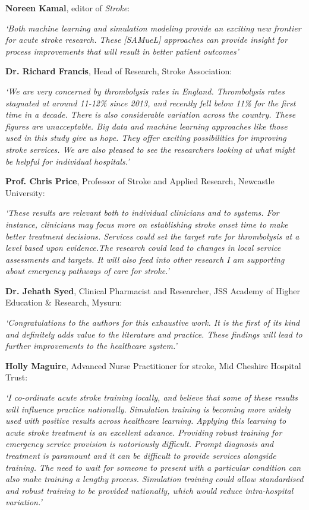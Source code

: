 \textbf{Noreen Kamal}, editor of \textit{Stroke}:

\textit{`Both machine learning and simulation modeling provide an exciting new frontier for acute stroke research. These [SAMueL] approaches can provide insight for process improvements that will result in better patient outcomes’}

\textbf{Dr. Richard Francis}, Head of Research, Stroke Association:

\textit{`We are very concerned by thrombolysis rates in England. Thrombolysis rates stagnated at around 11-12\% since 2013, and recently fell below 11\% for the first time in a decade. There is also considerable variation across the country. These figures are unacceptable. Big data and machine learning approaches like those used in this study give us hope. They offer exciting possibilities for improving stroke services. We are also pleased to see the researchers looking at what might be helpful for individual hospitals.’}

\textbf{Prof. Chris Price}, Professor of Stroke and Applied Research, Newcastle University: 

\textit{`These results are relevant both to individual clinicians and to systems. For instance, clinicians may focus more on establishing stroke onset time to make better treatment decisions. Services could set the target rate for thrombolysis at a level based upon evidence.The research could lead to changes in local service assessments and targets. It will also feed into other research I am supporting about emergency pathways of care for stroke.’}


\textbf{Dr. Jehath Syed}, Clinical Pharmacist and Researcher, JSS Academy of Higher Education \& Research, Mysuru: 

\textit{`Congratulations to the authors for this exhaustive work. It is the first of its kind and definitely adds value to the literature and practice. These findings will lead to further improvements to the healthcare system.’}

\textbf{Holly Maguire}, Advanced Nurse Practitioner for stroke, Mid Cheshire Hospital Trust: 

\textit{`I co-ordinate acute stroke training locally, and believe that some of these results will influence practice nationally. Simulation training is becoming more widely used with positive results across healthcare learning. Applying this learning to acute stroke treatment is an excellent advance. Providing robust training for emergency service provision is notoriously difficult. Prompt diagnosis and treatment is paramount and it can be difficult to provide services alongside training. The need to wait for someone to present with a particular condition can also make training a lengthy process. Simulation training could allow  standardised and robust training to be provided nationally, which would reduce intra-hospital variation.’
}
